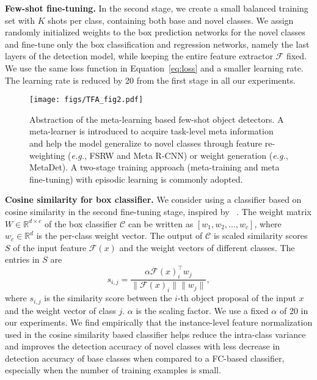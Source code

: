 \documentclass{article}
\newcommand\minisection[1]{\vspace{1mm}\noindent \textbf{#1}}
\begin{document}
\minisection{Few-shot fine-tuning.} In the second stage, we create a small balanced training set 
with $K$ shots per class, containing both base and novel classes.
We assign randomly initialized weights to the box prediction networks for the novel classes
and fine-tune only the box classification and
regression networks, namely the last layers of the detection model, while keeping the entire 
feature extractor $\mathcal{F}$ fixed. We use the same loss function
in Equation~\ref{eq:loss} and a smaller learning rate. The learning rate is reduced by 20 from the first stage in all our experiments. 

\begin{figure*}[ht]
    \centering
    \texttt{[image: figs/TFA\_fig2.pdf]}
    \vspace{-8mm}
    \caption{Abstraction of the meta-learning based few-shot object detectors. A meta-learner is introduced to acquire task-level meta information and help the model generalize to novel classes through feature re-weighting (\textit{e.g.}, FSRW and Meta R-CNN) or weight generation (\textit{e.g.}, MetaDet). A two-stage training approach (meta-training and meta fine-tuning) with episodic learning is commonly adopted.}
    \label{fig:meta_arch}
\end{figure*}

\minisection{Cosine similarity for box classifier.} We consider using a classifier based on cosine similarity in the second fine-tuning stage, inspired by ~\citet{gidaris2018dynamic,qi2018low,chen2019closer}. The weight matrix $W\in\mathbb{R}^{d\times c}$ of the box classifier $\mathcal{C}$ can be written as $[w_1, w_2, ..., w_c]$, where $w_c\in\mathbb{R}^d$ is the per-class weight vector. The output of $\mathcal{C}$ is scaled similarity scores $S$ of the input feature $\mathcal{F}(x)$ and the weight vectors of different classes. The entries in $S$ are 
\begin{equation}
    s_{i,j} = \frac{\alpha \mathcal{F}(x)_i^\top w_j}{\|\mathcal{F}(x)_i\| \|w_j\|}, 
\end{equation}
where $s_{i,j}$ is the similarity score between the $i$-th object proposal of the input $x$ and the weight vector of class $j$. $\alpha$ is the scaling factor. We use a fixed $\alpha$ of 20 in our experiments. We find empirically that the instance-level feature 
normalization used in the cosine similarity based classifier helps reduce the intra-class
variance and improves the detection accuracy of novel classes with less decrease in detection accuracy of base classes when compared to a FC-based classifier, especially when the number of training examples is small.
\end{document}
